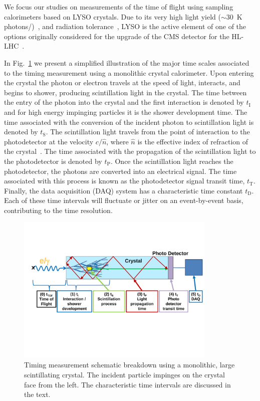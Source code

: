 We focus our studies on measurements of the time of flight using sampling calorimeters 
based on LYSO crystals. Due to its very high light yield 
($\sim 30$~\unit{K} photons/\MeV)~\cite{LYSOProperties}, and radiation 
tolerance~\cite{5402126, 4291695, 5402125, Dissertori:2013rma}, LYSO
is the active element of one of the options originally considered for the upgrade of the
CMS detector for the HL-LHC~\cite{Contardo:1605208}. 

In Fig.~\ref{fig:ScintillatorTiming} we present a simplified illustration of
the major time scales associated to the timing measurement using a monolithic
crystal calorimeter. Upon entering the crystal the photon or electron travels
at the speed of light, interacts, and begins to shower, producing scintillation light in the crystal. 
The time between the entry of the photon into the crystal and the first interaction is denoted by
$t_\mathrm{I}$ and for high energy impinging particles it is the shower development time. 
The time associated with the conversion of the incident photon to
scintillation light is denoted by $t_\mathrm{S}$. The scintillation light travels from
the point of interaction to the photodetector at the velocity $c/\hat{n}$, where
$\hat{n}$ is the effective index of refraction of the crystal~\cite{Moses}. The
time associated with the propagation of the scintillation light to the photodetector 
is denoted by $t_\mathrm{P}$. Once the scintillation light reaches the photodetector, the  photons 
are converted into an electrical signal. The time associated with this process is known as the
photodetector signal transit time, $t_\mathrm{T}$. Finally, the data acquisition (DAQ)
system has a characteristic time constant $t_\mathrm{D}$. Each of these time intervals will fluctuate or 
jitter on an event-by-event basis, contributing to the time resolution.


\begin{figure}[h] \centering
\includegraphics[width=0.85\textwidth]{figs/timing/ScintillatorTiming_v4}
\caption{ Timing measurement schematic breakdown using a monolithic, large scintillating crystal. 
The incident particle impinges on the crystal face from the left. The characteristic time intervals  are discussed 
in the text.}
\label{fig:ScintillatorTiming}
\end{figure}

